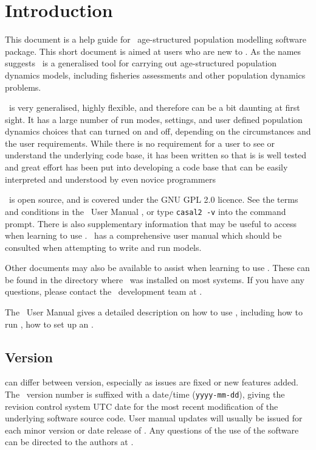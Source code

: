 \section{Introduction}\label{sec:introduction}

This document is a help guide for \CNAME\, age-structured population modelling software package. This short document is aimed at users who are new to \CNAME. As the names suggests \CNAME\ is a generalised tool for carrying out age-structured population dynamics models, including fisheries assessments and other population dynamics problems. 

\CNAME\ is very generalised, highly flexible, and therefore can be a bit daunting at first sight. It has a large number of run modes, settings, and user defined population dynamics choices that can turned on and off, depending on the circumstances and the user requirements. While there is no requirement for a user to see or understand the underlying code base, it has been written so that is is well tested and great effort has been put into developing a code base that can be easily interpreted and understood by even novice programmers

\CNAME\ is open source, and is covered under the GNU GPL 2.0 licence. See the terms and conditions in the \CNAME\ User Manual \citep{CASAL2}, or type \texttt{casal2 -v} into the command prompt. There is also supplementary information that may be useful to access when learning to use \CNAME. \CNAME\ has a comprehensive user manual \citep{CASAL2} which should be consulted when attempting to write and run models. 

Other documents may also be available to assist when learning to use \CNAME. These can be found in the directory where \CNAME\ was installed on most systems. If you have any questions, please contact the \CNAME\ development team at \email.

The \CNAME\ User Manual \citep{CASAL2} gives a detailed description on how to use \CNAME, including how to run \CNAME, how to set up an \config.  

\subsection{Version\label{sec:version}}

\CNAME can differ between version, especially as issues are fixed or new features added. The \CNAME\ version number is suffixed with a date/time (\texttt{yyyy-mm-dd}), giving the revision control system UTC date for the most recent modification of the underlying software source code. User manual updates will usually be issued for each minor version or date release of \CNAME. Any questions of the use of the software can be directed to the authors at \email. 

